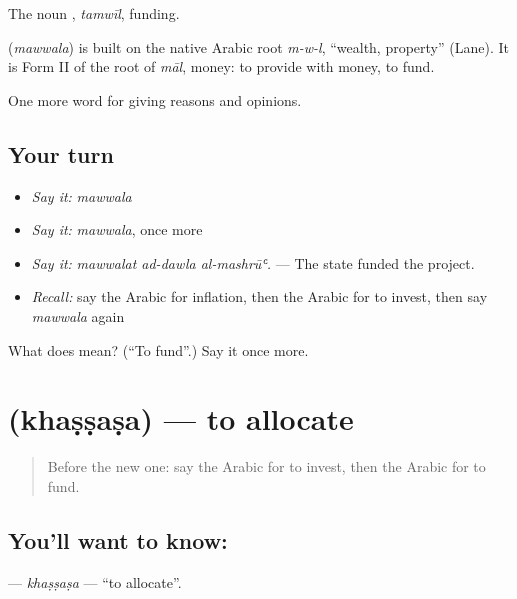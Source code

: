 The noun , \emph{tamwīl}, funding.

\begin{cousinweb}
\textbf{} (\emph{mawwala}) is built on the native Arabic root \emph{m-w-l}, \textquotedblleft{}wealth, property\textquotedblright{} (Lane). It is Form II of the root of \emph{māl}, money: to provide with money, to fund.
\end{cousinweb}

\begin{grammarlens}[title={What you've built}]
One more word for giving reasons and opinions.
\end{grammarlens}

\subsection*{Your turn}
\begin{itemize}
\raggedright
  \item \emph{Say it:} \emph{mawwala}
  \item \emph{Say it:} \emph{mawwala}, once more
  \item \emph{Say it:} \emph{mawwalat ad-dawla al-mashrūʿ.} — The state funded the project.
  \item \emph{Recall:} say the Arabic for inflation, then the Arabic for to invest, then say \emph{mawwala} again
\end{itemize}

\begin{tcolorbox}[breakable,colback=teal!4,colframe=teal!35!black,title={Before you move on}]
What does  mean? (\textquotedblleft{}To fund\textquotedblright{}.) Say it once more.
\end{tcolorbox}
\section[\texorpdfstring{\ar{خصص} (khaṣṣaṣa)}{خصص (khaṣṣaṣa)}]{ (khaṣṣaṣa) — to allocate}

\label{lesson:AR-C384-khassasa}



\begin{quote}
Before the new one: say the Arabic for to invest, then the Arabic for to fund.
\end{quote}

\subsection*{You'll want to know: }
\textbf{} — \emph{khaṣṣaṣa} — \textquotedblleft{}to allocate\textquotedblright{}.

